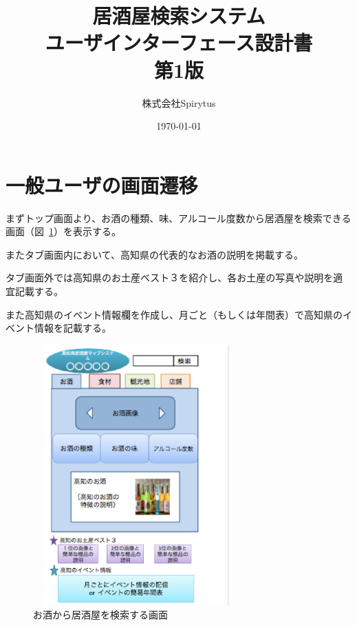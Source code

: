\documentclass[a4j,titlepage]{jarticle}
\title{居酒屋検索システム\\
ユーザインターフェース設計書\\
第1版}
\author{株式会社Spirytus}
\date{\today}
\begin{document}
\maketitle


\section{一般ユーザの画面遷移}



まずトップ画面より、お酒の種類、味、アルコール度数から居酒屋を検索できる画面（図~\ref{fig:1}）を表示する。



またタブ画面内において、高知県の代表的なお酒の説明を掲載する。



タブ画面外では高知県のお土産ベスト３を紹介し、各お土産の写真や説明を適宜記載する。



また高知県のイベント情報欄を作成し、月ごと（もしくは年間表）で高知県のイベント情報を記載する。



\begin {figure}[!htbp]
    \begin{center}
    \includegraphics [height=10cm, width=8cm]{1.eps}
    \caption {お酒から居酒屋を検索する画面}
    \label {fig:1}
    \end{center}
\end {figure}
\end{document}
